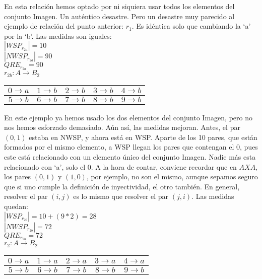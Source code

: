 	\noindent
	En esta relación hemos optado por ni siquiera usar todos los elementos del conjunto Imagen. Un auténtico desastre. Pero un desastre muy parecido al ejemplo de relación del punto anterior: $r_{1}$. Es idéntica solo que cambiando la `a' por la `b'. Las medidas son iguales:\\
	$|WSP_{r_{2a}}| = 10$\\
	$|NWSP_{r_{2a}}| = 90$\\
	$QRE_{r_{2a}}=90$
	\\
	
	\noindent
	$r_{2b}:A \longrightarrow B_{2}$
	\begin{table}[h!]
		\begin{tabular}{|c|c|c|c|c|}
			\hline
			$0 \longrightarrow a$ & $1 \longrightarrow b$ & $2 \longrightarrow b$ & $3 \longrightarrow b$ & $4 \longrightarrow b$ \\ 
			\hline
			$5 \longrightarrow b$ & $6 \longrightarrow b$ & $7 \longrightarrow b$ & $8 \longrightarrow b$ & $9 \longrightarrow b$ \\  
			\hline
		\end{tabular}
	\end{table}
	
	\noindent
	En este ejemplo ya hemos usado los dos elementos del conjunto Imagen, pero no nos hemos esforzado demasiado. Aún así, las medidas mejoran. Antes, el par $(0,1)$ estaba en NWSP, y ahora está en WSP. Aparte de los 10 pares, que están formados por el mismo elemento, a WSP llegan los pares que contengan el 0, pues este está relacionado con un elemento único del conjunto Imagen. Nadie más esta relacionado con `a', solo el 0. A la hora de contar, conviene recordar que en $A X A$, los pares $(0,1)$ y $(1,0)$, por ejemplo, no son el mismo, aunque sepamos seguro que si uno cumple la definición de inyectividad, el otro también. En general, resolver el par $(i,j)$ es lo mismo que resolver el par $(j,i)$. Las medidas quedan:\\
	$|WSP_{r_{2b}}| = 10+(9*2) = 28$\\
	$|NWSP_{r_{2b}}| = 72$\\
	$QRE_{r_{2b}}=72$
	\\
	
	\noindent
	$r_{2}:A \longrightarrow B_{2}$
	\begin{table}[h!]
		\begin{tabular}{|c|c|c|c|c|}
			\hline
			$0 \longrightarrow a$ & $1 \longrightarrow a$ & $2 \longrightarrow a$ & $3 \longrightarrow a$ & $4 \longrightarrow a$ \\ 
			\hline
			$5 \longrightarrow b$ & $6 \longrightarrow b$ & $7 \longrightarrow b$ & $8 \longrightarrow b$ & $9 \longrightarrow b$ \\  
			\hline
		\end{tabular}
	\end{table}
	

